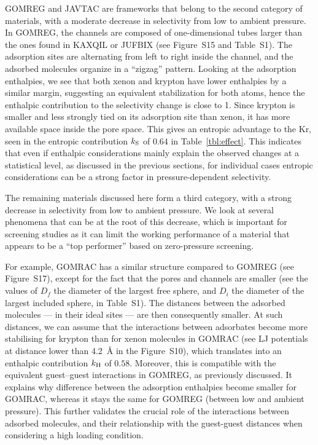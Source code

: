 \documentclass[main.tex]{subfiles}
\begin{document}
  GOMREG and JAVTAC are frameworks that belong to the second category of materials, with a moderate decrease in selectivity from low to ambient pressure. In GOMREG, the channels are composed of one-dimensional tubes larger than the ones found in KAXQIL or JUFBIX (see Figure~S15 and Table~S1). The adsorption sites are alternating from left to right inside the channel, and the adsorbed molecules organize in a ``zigzag'' pattern. Looking at the adsorption enthalpies, we see that both xenon and krypton have lower enthalpies by a similar margin, suggesting an equivalent stabilization for both atoms, hence the enthalpic contribution to the selectivity change is close to 1.
  Since krypton is smaller and less strongly tied on its adsorption site than xenon, it has more available space inside the pore space. This gives an entropic advantage to the Kr, seen in the entropic contribution $k_{\text{S}}$ of $0.64$ in Table~\ref{tbl:effect}. This indicates that even if enthalpic considerations mainly explain the observed changes at a statistical level, as discussed in the previous sections, for individual cases entropic considerations can be a strong factor in pressure-dependent selectivity.
  
  The remaining materials discussed here form a third category, with a strong decrease in selectivity from low to ambient pressure. We look at several phenomena that can be at the root of this decrease, which is important for screening studies as it can limit the working performance of a material that appears to be a ``top performer'' based on zero-pressure screening.
  
  
  For example, GOMRAC has a similar structure compared to GOMREG (see Figure~S17), except for the fact that the pores and channels are smaller (see the values of $D_f$ the diameter of the largest free sphere, and $D_i$ the diameter of the largest included sphere, in Table~S1). The distances between the adsorbed molecules --- in their ideal sites --- are then consequently smaller. At such distances, we can assume that the interactions between adsorbates become more stabilising for krypton than for xenon molecules in GOMRAC (see LJ potentials at distance lower than \SI{4.2}{\angstrom} in the Figure~S10), which translates into an enthalpic contribution $k_{\text{H}}$ of $0.58$. Moreover, this is compatible with the equivalent guest--guest interactions in GOMREG, as previously discussed. It explains why difference between the adsorption enthalpies become smaller for GOMRAC, whereas it stays the same for GOMREG (between low and ambient pressure). This further validates the crucial role of the interactions between adsorbed molecules, and their relationship with the guest-guest distances when considering a high loading condition.
  
\end{document}
